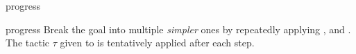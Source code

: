 \begin{tactic}{progress}
  \begin{tsyntax}[empty]{progress}
  Break the goal into multiple \emph{simpler} ones by repeatedly applying
  ,  and . The tactic $\tau$ given to
   is tentatively applied after each step.
  \end{tsyntax}

\end{tactic}
